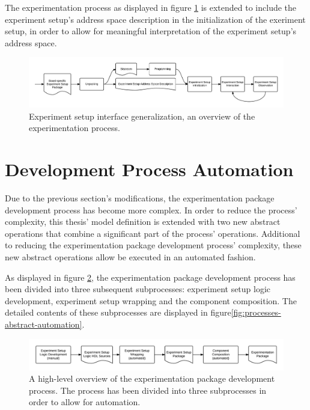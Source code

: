 \documentclass[main.tex]{subfiles}
\begin{document}
The experimentation process as displayed in figure \ref{fig:processes-abstract-experimentation} is extended to include the experiment setup's address space description in the initialization of the exeriment setup, in order to allow for meaningful interpretation of the experiment setup's address space. 

\begin{figure}[h]
    \caption{ Experiment setup interface generalization, an overview of the experimentation process.}
    \label{fig:processes-abstract-experimentation}
    \centering
    \includegraphics[width=\textwidth]{img/processes-abstract-experimentation}
\end{figure}


\section{Development Process Automation}
\label{sectiondevelopmentprocessabstraction}

Due to the previous section's modifications, the experimentation package development process has become more complex. In order to reduce the process' complexity, this thesis' model definition is extended with two new abstract operations that combine a significant part of the process' operations. Additional to reducing the experimentation package development process' complexity, these new abstract operations allow be executed in an automated fashion.

As displayed in figure \ref{fig:processes-abstract-automation-overview}, the experimentation package development process has been divided into three subsequent subprocesses: experiment setup logic development, experiment setup wrapping and the component composition. The detailed contents of these subprocesses are displayed in figure\ref{fig:processes-abstract-automation}. 

\begin{figure}[h]
    \caption{A high-level overview of the experimentation package development process. The process has been divided into three subprocesses in order to allow for automation.}
    \label{fig:processes-abstract-automation-overview}
    \centering
    \includegraphics[width=\textwidth]{img/processes-abstract-automation-overview}
\end{figure}
\end{document}
